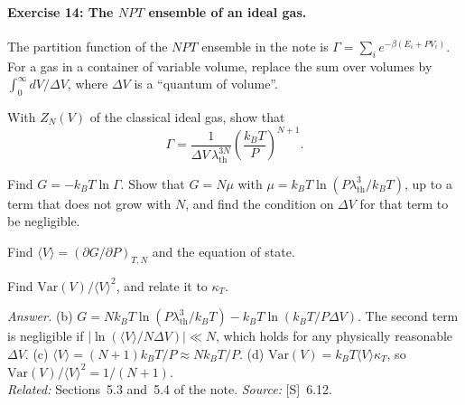 \documentclass[11pt]{article}      %
\numberwithin{equation}{section}   %
\begin{document}
\paragraph{Exercise 14: The $NPT$ ensemble of an ideal gas.}
The partition function of the $NPT$ ensemble in the note is $\Gamma = \sum_i e^{-\beta(E_i + PV_i)}$. For a gas in a container of variable volume, replace the sum over volumes by $\int_0^\infty dV/\Delta V$, where $\Delta V$ is a ``quantum of volume''.
\begin{parts}
    \item With $Z_N(V)$ of the classical ideal gas, show that
    \begin{equation*}
        \Gamma = \frac{1}{\Delta V\,\lambda_{\text{th}}^{3N}}\left(\frac{k_BT}{P}\right)^{N+1}.
    \end{equation*}
    \item Find $G = -k_BT\ln\Gamma$. Show that $G = N\mu$ with $\mu = k_BT\ln(P\lambda_{\text{th}}^3/k_BT)$, up to a term that does not grow with $N$, and find the condition on $\Delta V$ for that term to be negligible.
    \item Find $\langle V\rangle = (\partial G/\partial P)_{T,N}$ and the equation of state.
    \item Find $\mathrm{Var}(V)/\langle V\rangle^2$, and relate it to $\kappa_T$.
\end{parts}
\textit{Answer.} (b) $G = Nk_BT\ln(P\lambda_{\text{th}}^3/k_BT) - k_BT\ln(k_BT/P\Delta V)$. The second term is negligible if $|\ln(\langle V\rangle/N\Delta V)| \ll N$, which holds for any physically reasonable $\Delta V$. (c) $\langle V\rangle = (N + 1)k_BT/P \approx Nk_BT/P$. (d) $\mathrm{Var}(V) = k_BT\langle V\rangle\kappa_T$, so $\mathrm{Var}(V)/\langle V\rangle^2 = 1/(N + 1)$.\\
\textit{Related:} Sections~5.3 and~5.4 of the note. \textit{Source:} [S]~6.12.
\end{document}
